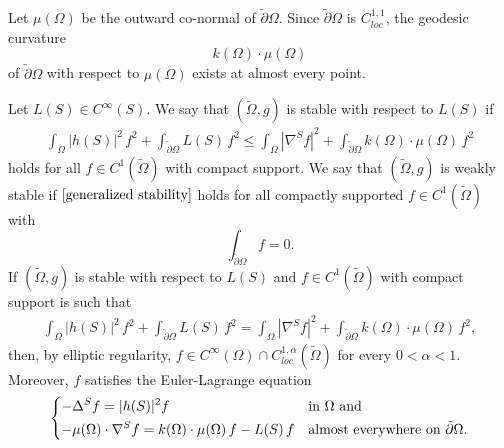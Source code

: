 \documentclass[11pt]{amsart}
\begin{document}
\begin{appendices}
Let $\mu(\Omega)$ be the outward co-normal of $\tilde \partial \Omega$. Since $\tilde \partial \Omega$ is $C_{loc}^{1,1}$, the geodesic curvature $$k( \Omega)\cdot\mu(\Omega)$$ of $\tilde \partial \Omega$ with respect to $\mu(\Omega)$ exists at almost every point.  

Let $L(S)\in C^\infty(S)$. We say that $(\tilde \Omega,g)$ is stable with respect to $L(S)$ if  
\begin{align} \label{generalized stability} 
	\int_{ \Omega} |h(S)|^2\,f^2+\int_{\tilde \partial \Omega} L(S)\,f^2\leq \int_{ \Omega} |\nabla^S f|^2+\int_{\tilde \partial \Omega} k(\Omega)\cdot \mu(\Omega)\,f^2
\end{align} 
holds for all $f\in C^1(\tilde \Omega)$ with compact support. 
We say that $(\tilde \Omega,g)$ is weakly stable if $\eqref{generalized stability}$ holds for all compactly supported $f\in C^1(\tilde \Omega)$ with  
$$
\int_{\tilde \partial \Omega} f=0.
$$
If $(\tilde \Omega,g)$ is stable with respect to $L(S)$ and $f\in C^1(\tilde \Omega)$ with compact support is such that 
\begin{align*} 
	\int_{\Omega} |h(S)|^2\,f^2+\int_{\tilde \partial \Omega} L(S)\,f^2= \int_\Omega |\nabla^S f|^2+\int_{\tilde \partial \Omega} k(\Omega)\cdot \mu(\Omega)\,f^2,
\end{align*} 
then, by elliptic regularity, $f\in C^\infty(\Omega)\cap C_{loc}^{1,\alpha}(\tilde \Omega)$ for every $0<\alpha<1$. Moreover, $f$ satisfies the Euler-Lagrange equation
\begin{equation} \label{Euler-Lagrange}
	\begin{dcases}	-\Delta^{S}f=|h(S)|^2f\qquad&\text{in $\Omega$ and}\\
		-\mu(\Omega)\cdot \nabla^S f=k(\Omega)\cdot \mu(\Omega)\,f-L(S)\,f&\text{almost everywhere on $\tilde \partial \Omega$}.	
	\end{dcases} 
\end{equation}


\end{appendices}
\end{document}
